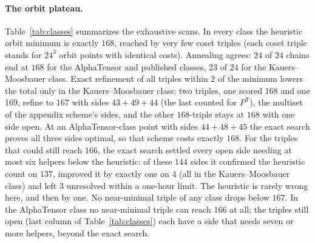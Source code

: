 \documentclass[11pt]{article}
\theoremstyle{remark}
\begin{document}
\paragraph{The orbit plateau.}  Table~\ref{tab:classes} summarizes the
exhaustive scans.  In every class the heuristic orbit minimum is exactly
$168$, reached by very few coset triples (each coset triple stands for
$24^3$ orbit points with identical costs).  Annealing agrees: $24$ of
$24$ chains end at $168$ for the AlphaTensor and published classes, $23$
of $24$ for the Kauers--Moosbauer class.  Exact refinement of all
triples within $2$ of the minimum lowers the total only in the
Kauers--Moosbauer class: two triples, one scored $168$ and one $169$,
refine to $167$ with sides $43+49+44$ (the last counted for
$P^{\mathsf T}$), the multiset of the appendix scheme's sides, and the
other $168$-triple stays at $168$ with one side open.  At an
AlphaTensor-class point with sides $44+48+45$ the exact search proves
all three sides optimal, so that scheme costs exactly $168$.  For the
triples that could still reach $166$, the exact search settled every
open side needing at most six helpers below the heuristic: of these
$144$ sides it confirmed the heuristic count on $137$, improved it by
exactly one on $4$ (all in the Kauers--Moosbauer class) and left $3$
unresolved within a one-hour limit.  The heuristic is rarely wrong here,
and then by one.  No near-minimal triple of any class drops below
$167$.  In the AlphaTensor class no near-minimal triple can reach $166$
at all; the triples still open (last column of Table~\ref{tab:classes})
each have a side that needs seven or more helpers, beyond the exact
search.
\end{document}
